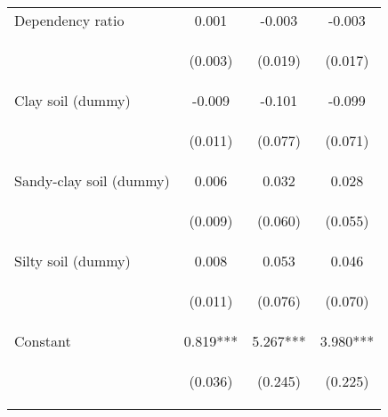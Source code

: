 \begin{center}
\begin{tabular}{lccc}
Dependency ratio & 0.001 & -0.003 & -0.003 \\
\vspace{4pt} & \begin{footnotesize}(0.003)\end{footnotesize} & \begin{footnotesize}(0.019)\end{footnotesize} & \begin{footnotesize}(0.017)\end{footnotesize} \\
Clay soil (dummy) & -0.009 & -0.101 & -0.099 \\
\vspace{4pt} & \begin{footnotesize}(0.011)\end{footnotesize} & \begin{footnotesize}(0.077)\end{footnotesize} & \begin{footnotesize}(0.071)\end{footnotesize} \\
Sandy-clay soil (dummy) & 0.006 & 0.032 & 0.028 \\
\vspace{4pt} & \begin{footnotesize}(0.009)\end{footnotesize} & \begin{footnotesize}(0.060)\end{footnotesize} & \begin{footnotesize}(0.055)\end{footnotesize} \\
Silty soil (dummy) & 0.008 & 0.053 & 0.046 \\
\vspace{4pt} & \begin{footnotesize}(0.011)\end{footnotesize} & \begin{footnotesize}(0.076)\end{footnotesize} & \begin{footnotesize}(0.070)\end{footnotesize} \\
Constant & 0.819*** & 5.267*** & 3.980*** \\
 & \begin{footnotesize}(0.036)\end{footnotesize} & \begin{footnotesize}(0.245)\end{footnotesize} & \begin{footnotesize}(0.225)\end{footnotesize} \\

\end{tabular}
\end{center}
